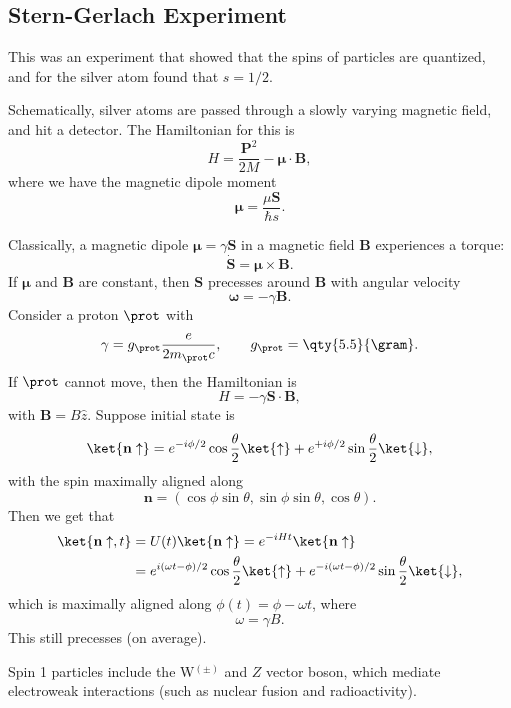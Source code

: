 \documentclass[12pt]{article}
\begin{document}
\subsection{Stern-Gerlach Experiment}
\label{sub:stern_gerlach}

This was an experiment that showed that the spins of particles are quantized, and for the silver atom found that $s = 1/2$.

Schematically, silver atoms are passed through a slowly varying magnetic field, and hit a detector. The Hamiltonian for this is
\[
H = \frac{\mathbf{P}^2}{2M} - \bm{\mu} \cdot \mathbf{B},
\]
where we have the magnetic dipole moment
\[
\bm{\mu} = \frac{\mu \mathbf{S}}{\hbar s}.
\]

Classically, a magnetic dipole $\bm{\mu}= \gamma \mathbf{S}$ in a magnetic field $\mathbf{B}$ experiences a torque:
\[
\mathbf{\dot S} = \bm{\mu} \times \mathbf{B}.
\]
If $\bm{\mu}$ and $\mathbf{B}$ are constant, then $\mathbf{S}$ precesses around $\mathbf{B}$ with angular velocity
\[
\bm{\omega} = -\gamma \mathbf{B}.
\]
Consider a proton $\prot$ with
\[
	\gamma = g_{\prot} \frac{e}{2 m_{\prot} c}, \qquad g_{\prot} = \qty{5.5}{\gram}.
\]
If $\prot$ cannot move, then the Hamiltonian is
\[
H = - \gamma \mathbf{S} \cdot \mathbf{B},
\]
with $\mathbf{B} = B \hat z$. Suppose initial state is
\[
	\ket{\mathbf{n} \uparrow} = e^{-i \phi/2} \cos \frac{\theta}{2} \ket{\uparrow} + e^{+i \phi/2} \sin \frac{\theta}{2} \ket{\downarrow},
\]
with the spin maximally aligned along
\[
\mathbf{n} = (\cos \phi \sin \theta, \sin \phi \sin \theta, \cos \theta).
\]
Then we get that
\begin{align*}
	\ket{\mathbf{n} \uparrow, t} &= U(t) \ket{\mathbf{n} \uparrow} = e^{-i H t} \ket{\mathbf{n} \uparrow} \\
				     &= e^{i(\omega t - \phi)/2} \cos \frac{\theta}{2} \ket{\uparrow} + e^{-i(\omega t - \phi)/2}\sin \frac{\theta}{2} \ket{\downarrow},
\end{align*}
which is maximally aligned along $\phi(t) = \phi - \omega t$, where
\[
\omega = \gamma B.
\]
This still precesses (on average).

Spin 1 particles include the W$^{(\pm)}$ and $Z$ vector boson, which mediate electroweak interactions (such as nuclear fusion and radioactivity).
\end{document}
